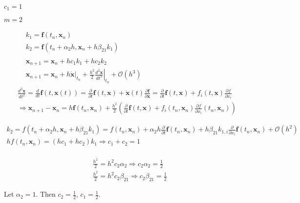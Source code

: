 \documentclass[10pt]{amsart}
\begin{document}
\begin{multicols*}{2}
$c_1= 1$ 

$m=2$

\[
\begin{gathered}
	\begin{aligned}
		& k_1 = \mathbf{f}(t_n, \mathbf{x}_n) \\
		& k_2 = \mathbf{f}(t_n + \alpha_2 h, \mathbf{x}_n + h \beta_{21} k_1)
	\end{aligned} \\
\begin{aligned}
	& \mathbf{x}_{n+1} = \mathbf{x}_n + hc_1 k_1 + hc_2 k_2 \\
	& \mathbf{x}_{n+1} = \mathbf{x}_n + h \left. \dot{ \mathbf{x}} \right|_{t_n} + \frac{h^2}{2} \left. \frac{d^2 \mathbf{x}}{ dt^2} \right|_{t_n} + \mathcal{O}(h^3)
\end{aligned} \\
\frac{d^2 \mathbf{x}}{dt^2} = \frac{d}{dt} \mathbf{f}(t, \mathbf{x}(t)) = \frac{\partial}{\partial t} \mathbf{f}(t, \mathbf{x}) + \dot{ \mathbf{x}}(t) \frac{\partial \mathbf{f}}{\partial \mathbf{x}} = \frac{ \partial }{ \partial t} \mathbf{f}(t, \mathbf{x}) + f_i(t,\mathbf{x}) \frac{\partial f}{ \partial x_i} \\
\Longrightarrow \mathbf{x}_{n+1} - \mathbf{x}_n = h \mathbf{f}(t_n , \mathbf{x}_n) + \frac{h^2}{2} \left( \frac{\partial }{ \partial t} \mathbf{f}(t, \mathbf{x}) + f_i(t_n , \mathbf{x}_n) \frac{\partial f}{ \partial x_i}(t_n,\mathbf{x}_n) \right)
\end{gathered}
\]

\[
\begin{gathered}
k_2 = f(t_n+\alpha_2 h, \mathbf{x}_n + h\beta_{21} k_1) = f(t_n,\mathbf{x}_n) + \alpha_2 h \frac{\partial}{\partial t} \mathbf{f}(t_n,\mathbf{x}_n) + h \beta_{21} k_{1, i} \frac{\partial}{\partial x_i} \mathbf{f}(t_n, \mathbf{x}_n) + \mathcal{O}(h^2)	 \\
hf(t_n,\mathbf{x}_n) = (hc_1 + hc_2) k_1 \Longrightarrow c_1 + c_2 = 1 \\
\end{gathered}
\]

\[
\begin{aligned}
	& \frac{h^2}{2} = h^2 c_2 \alpha_2 \Longrightarrow c_2\alpha_2 = \frac{1}{2} \\
 	& \frac{h^2}{2} = h^2 c_2 \beta_{21} \Longrightarrow c_2 \beta_{21} = \frac{1}{2}
\end{aligned}
\]

Let $\alpha_2 = 1$. Then $c_2 = \frac{1}{2}$, $c_1= \frac{1}{2}$.


\end{multicols*}
\end{document}
